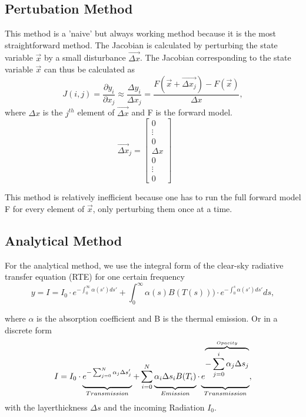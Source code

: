 \documentclass[a4paper,fleqn]{article}
\begin{document}
\subsection*{Pertubation Method}
This method is a 'naive' but always working method because it is the most
straightforward method. The Jacobian is calculated by perturbing the state
variable $\vec{x}$ by a small disturbance $\vec{\Delta x}$. The Jacobian
corresponding to the state variable $\vec{x}$ can thus be calculated as
\begin{equation}
J(i,j)=\frac{\partial y_i}{\partial x_j} \approx \frac{\Delta y_i}{\Delta x_j} =
\frac{F(\vec{x}+\vec{\Delta x_j})-F(\vec{x})}{\Delta x},
\end{equation}
where $\Delta x$ is the $j^{th}$ element of $\vec{\Delta x} $ and F is the
forward model.
{
	\begin{equation*}
	\vec{\Delta x}_j=\left[\begin{array}{c} 0 \\ \vdots \\0\\ \Delta x \\ 0\\ \vdots
	\\0\end{array}\right] \qquad
	\end{equation*}
}

This method is relatively inefficient because one has to run the full forward
model F for every element of $\vec{x}$, only perturbing them once at a time.

\subsection*{Analytical Method}
For the analytical method, we use the integral form of the clear-sky radiative
transfer equation (RTE) for one certain frequency
\begin{equation*}
y=I=I_0 \cdot e^{-\int_0^\infty \alpha(s') ds'}+ \int_0^\infty \alpha(s)B(T(s)))
\cdot e^{-\int_0^s \alpha(s')ds'} ds,
\end{equation*}

where $\alpha$ is the absorption coefficient and B is the thermal emission. Or
in a discrete form
\begin{equation*}
I=I_0 \cdot \underbrace{\vphantom{\frac{a}{b}}e^{-\sum_{j=0}^N \alpha_j \Delta
		s_j'}}_{\substack{Transmission}}+ \sum_{i=0}^N
\underbrace{\vphantom{\frac{a}{b}}\alpha_i \Delta s_i
	B(T_i)}_{\substack{Emission}} \cdot
\underbrace{\vphantom{\frac{a}{b}}e^{\overbrace{-\sum_{j=0}^i \alpha_j \Delta
			s_j}^{Opacity}}}_{\substack{Transmission}},
\end{equation*}
with the layerthickness $\Delta s$ and the incoming Radiation $I_0$.\\
\end{document}
